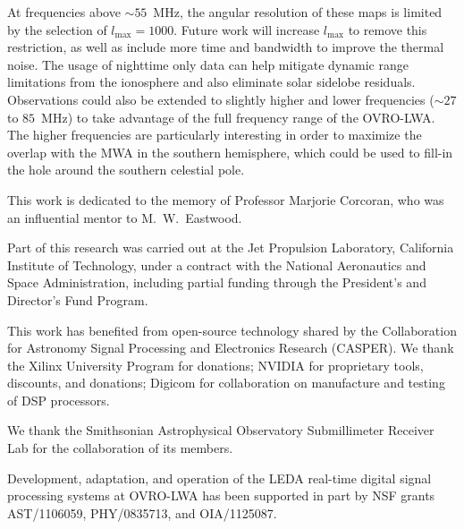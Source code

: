 \documentclass[twocolumn]{aastex61}
\begin{document}
At frequencies above $\sim55$~MHz, the angular resolution of these maps is limited by the selection
of $l_\text{max}=1000$. Future work will increase $l_\text{max}$ to remove this restriction, as well
as include more time and bandwidth to improve the thermal noise. The usage of nighttime only data
can help mitigate dynamic range limitations from the ionosphere and also eliminate solar sidelobe
residuals. Observations could also be extended to slightly higher and lower frequencies ($\sim27$ to
$85$~MHz) to take advantage of the full frequency range of the OVRO-LWA. The higher frequencies are
particularly interesting in order to maximize the overlap with the MWA in the southern hemisphere,
which could be used to fill-in the hole around the southern celestial pole.

\acknowledgments
This work is dedicated to the memory of Professor Marjorie Corcoran, who was an influential mentor
to M.~W.~Eastwood.

Part of this research was carried out at the Jet Propulsion Laboratory, California Institute of
Technology, under a contract with the National Aeronautics and Space Administration, including
partial funding through the President's and Director's Fund Program.

This work has benefited from open-source technology shared by the Collaboration for Astronomy Signal
Processing and Electronics Research (CASPER).  We thank the Xilinx University Program for donations;
NVIDIA for proprietary tools, discounts, and donations; Digicom for collaboration on manufacture and
testing of DSP processors.

We thank the Smithsonian Astrophysical Observatory Submillimeter Receiver Lab for the collaboration
of its members.

Development, adaptation, and operation of the LEDA real-time digital signal processing systems at
OVRO-LWA has been supported in part by NSF grants AST/1106059, PHY/0835713, and OIA/1125087.



\end{document}
